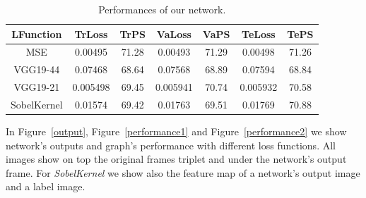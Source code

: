 \documentclass[11pt, a4paper]{article}
\begin{document}
	\begin{table}
		\centering
		\begin{tabular}{|c|c|c|c|c|c|c|}
			\hline
			\textbf{LFunction} & \textbf{TrLoss} & \textbf{TrPS} & \textbf{VaLoss} & \textbf{VaPS} & \textbf{TeLoss} & \textbf{TePS}\\
			\hline
			MSE & 0.00495 & 71.28 & 0.00493 & 71.29 & 0.00498 & 71.26\\
			\hline
			VGG19-44 & 0.07468 & 68.64 & 0.07568 & 68.89 & 0.07594 & 68.84\\
			\hline
			VGG19-21 & 0.005498 & 69.45 & 0.005941 & 70.74 & 0.005932 & 70.58\\
			\hline
			SobelKernel & 0.01574 & 69.42 & 0.01763 & 69.51 & 0.01769 & 70.88\\
			\hline
		\end{tabular}
		\caption{Performances of our network.}
		\label{tab:results}
	\end{table}

	In Figure~\ref{output}, Figure~\ref{performance1} and Figure~\ref{performance2} we show network's outputs and graph's performance with different loss functions. All images show on top the original frames triplet and under the network's output frame. For \textit{SobelKernel} we show also the feature map of a network's output image and a label image.
	
\end{document}
